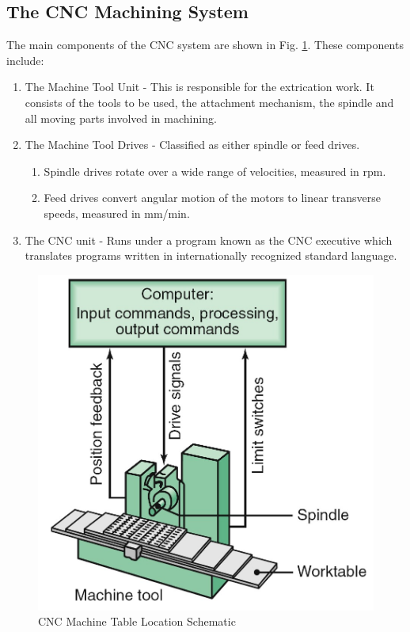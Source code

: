 \subsection{The CNC Machining System}
The main components of the CNC system are shown in Fig. \ref{fig:cnc}. These components include:
\begin{enumerate}
	\item The Machine Tool Unit - This is responsible for the extrication work. It consists of the tools to be used, the attachment mechanism, the spindle and all moving parts involved in machining.
	\item The Machine Tool Drives - Classified as either spindle or feed drives. \begin{enumerate}
		\item Spindle drives rotate over a wide range of velocities, measured in rpm.
		\item Feed drives convert angular motion of the motors to linear transverse speeds, measured in mm/min.
	\end{enumerate}
	\item The CNC unit - Runs under a program known as the CNC executive which translates programs written in internationally recognized standard language.
\end{enumerate}
\begin{figure}[h!]
	\centering
	\includegraphics[width=0.8\linewidth]{Figures/cncschematic}
	\caption[CNC Machining System Schematic]{CNC Machine Table Location Schematic}
	\label{fig:cnc}
\end{figure}
